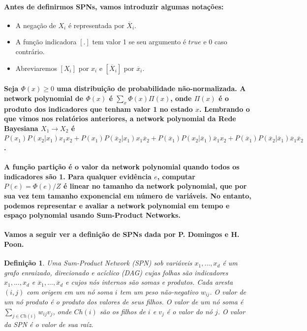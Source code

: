 \documentclass[a4paper,10pt]{article}
\theoremstyle{plain}
\newtheorem*{spn-def}{Definição}
\begin{document}
\paragraph{
  Antes de definirmos SPNs, vamos introduzir algumas notações:
}

\begin{itemize}
  \item A negação de $X_i$ é representada por $\overline{X}_i$.
  \item A função indicadora\cite{report-1} $[.]$ tem valor 1 se seu argumento é $true$ e 0 caso
    contrário.
  \item Abreviaremos $[X_i]$ por $x_i$ e $[\overline{X}_i]$ por $\overline{x}_i$.
\end{itemize}

\paragraph{
  Seja $\Phi(x) \geq 0$ uma distribuição de probabilidade não-normalizada. A network polynomial
  \cite{report-1} de $\Phi(x)$ é $\sum_x \Phi(x) \Pi (x)$, onde $\Pi(x)$ é o produto dos
  indicadores que tenham valor 1 no estado $x$. Lembrando o que vimos nos relatórios anteriores,
  a network polynomial da Rede Bayesiana $X_1 \to X_2$ é $P(x_1)P(x_2|x_1)x_1x_2+P(x_1)
  P(\overline{x}_2|x_1)x_1\overline{x}_2+P(\overline{x}_1)P(x_2|\overline{x}_1)\overline{x}_1x_2+
  P(\overline{x}_1)P(\overline{x}_2|\overline{x}_1)\overline{x}_1\overline{x}_2$.
}

\paragraph{
  A função partição é o valor da network polynomial quando todos os indicadores são 1. Para
  qualquer evidência $e$, computar $P(e)=\Phi(e)/Z$ é linear no tamanho da network polynomial, que
  por sua vez tem tamanho exponencial em número de variáveis. No entanto, podemos representar e
  avaliar a network polynomial em tempo e espaço polynomial usando Sum-Product Networks.
}

\paragraph{
  Vamos a seguir ver a definição de SPNs dada por P. Domingos e H. Poon\cite{poon-domingos}.
}

\begin{spn-def} Uma Sum-Product Network (SPN) sob variáveis $x_1,...,x_d$ é um grafo enraizado,
  direcionado e acíclico (DAG) cujas folhas são indicadores $x_1,...,x_d$ e $\overline{x}_1,...,
  \overline{x}_d$ e cujos nós internos são somas e produtos. Cada aresta $(i,j)$ com origem em um
  nó soma $i$ tem um peso não-negativo $w_{ij}$. O valor de um nó produto é o produto dos valores
  de seus filhos. O valor de um nó soma é $\sum_{j \in Ch(i)} w_{ij}v_j$, onde $Ch(i)$ são os
  filhos de $i$ e $v_j$ é o valor do nó $j$. O valor da SPN é o valor de sua raíz.
\end{spn-def}
\end{document}
